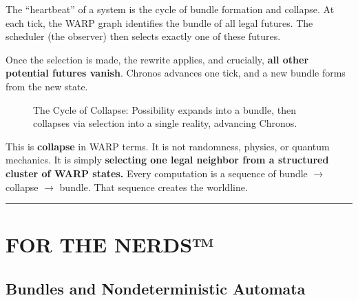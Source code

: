 The ``heartbeat'' of a \COMPUTER{} system is the cycle of bundle formation and collapse. At each tick, the WARP graph identifies the bundle of all legal futures. The scheduler (the observer) then selects exactly one of these futures.

Once the selection is made, the rewrite applies, and crucially, \textbf{all other potential futures vanish}. Chronos advances one tick, and a new bundle forms from the new state.

\begin{figure}[h]
\centering
{}
\caption{The Cycle of Collapse: Possibility expands into a bundle, then collapses via selection into a single reality, advancing Chronos.}
\end{figure}

This is \textbf{collapse} in WARP terms. It is not randomness, physics, or quantum mechanics. It is simply \textbf{selecting one legal neighbor from a structured cluster of WARP states.} Every computation is a sequence of bundle $\rightarrow$ collapse $\rightarrow$ bundle. That sequence creates the worldline.

\begin{center}\rule{0.5\linewidth}{0.5pt}\end{center}

\section*{\texorpdfstring{\textbf{FOR THE NERDS™}}{FOR THE NERDS™}}

\subsection{\texorpdfstring{\textbf{Bundles and Nondeterministic Automata}}{Bundles and Nondeterministic Automata}}

